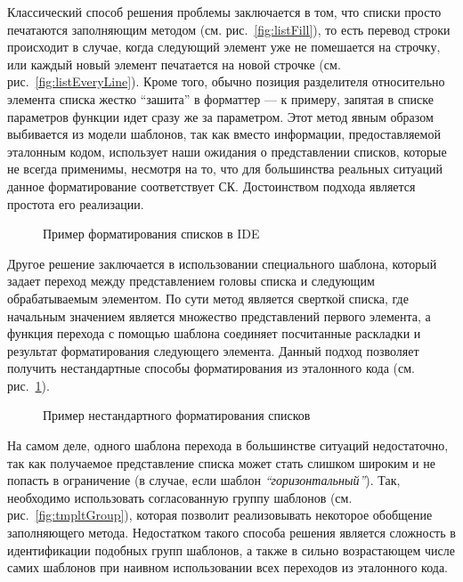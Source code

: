 Классический способ решения проблемы заключается в том, что
списки просто печатаются заполняющим методом (см. рис.~\ref{fig:listFill}),
то есть перевод строки происходит
в случае, когда следующий элемент уже не помешается на строчку, или каждый
новый элемент печатается на новой строчке (см. рис.~\ref{fig:listEveryLine}).
Кроме того, обычно позиция разделителя относительно элемента списка жестко
``зашита'' в форматтер --- к примеру,
запятая в списке параметров функции идет сразу же за параметром.
Этот метод явным образом выбивается из модели шаблонов, так как
вместо информации, предоставляемой эталонным кодом, использует наши
ожидания о представлении списков, которые не всегда применимы,
несмотря на то, что для большинства реальных ситуаций данное форматирование
соответствует СК.
Достоинством подхода является простота его реализации.

\begin{figure}[h!]
  \caption{Пример форматирования списков в IDE}
\end{figure}

Другое решение заключается в использовании специального шаблона, который
задает переход между представлением головы списка и следующим обрабатываемым
элементом. По сути метод является сверткой списка, где начальным значением
является множество представлений первого элемента, а функция перехода с помощью
шаблона соединяет
посчитанные раскладки и результат форматирования следующего элемента.
Данный подход позволяет получить нестандартные способы форматирования
из эталонного кода (см. рис.~\ref{fig:listGoodLine}).

\begin{figure}[h!]
  
  \caption{Пример нестандартного форматирования списков}
  \label{fig:listGoodLine}
\end{figure}

На самом деле, одного шаблона перехода 
в большинстве ситуаций недостаточно,
так как получаемое представление списка может стать слишком широким и не попасть
в ограничение (в случае, если шаблон \emph{``горизонтальный''}).
Так, необходимо использовать согласованную группу шаблонов
(см. рис.~\ref{fig:tmpltGroup}), которая
позволит реализовывать некоторое обобщение заполняющего метода.
Недостатком такого способа решения является сложность в идентификации подобных
групп шаблонов, а также в сильно возрастающем числе самих шаблонов при наивном
использовании всех переходов из эталонного кода.

